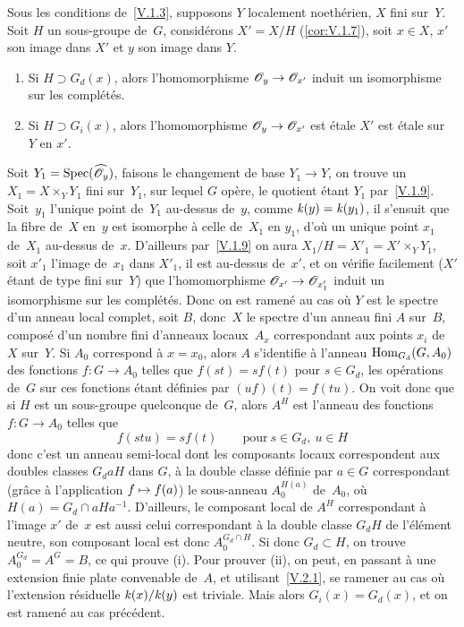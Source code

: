 \begin{proposition}
\label{V.2.2}
Sous les conditions de~\ref{V.1.3}, supposons $Y$ localement
noeth\'erien, $X$ fini sur~$Y$. Soit $H$ un sous-groupe de~$G$,
consid\'erons $X'=X/H$ (\cf \ref{cor:V.1.7}), soit
$x\in X$, $x'$ son image dans $X'$ et $y$ son image dans $Y$.
\begin{enumerate}
\item[(i)] Si $H\supset G_d(x)$, alors l'homomorphisme
$\cal{O}_y\to\cal{O}_{x'}$ induit un isomorphisme sur les
compl\'et\'es.
\item[(ii)] Si $H\supset G_i(x)$, alors l'homomorphisme $\cal{O}_y\to
\cal{O}_{x'}$ est \'etale \ie $X'$ est \'etale sur~$Y$ en $x'$.
\end{enumerate}
\end{proposition}
Soit $Y_1=\Spec(\widehat{\cal{O}_y})$, faisons le changement de base
$Y_1\to Y$, on trouve un $X_1=X\times_Y Y_1$ fini sur~$Y_1$, sur
lequel $G$ op\`ere, le quotient \'etant $Y_1$
par~\ref{V.1.9}. Soit~$y_1$ l'unique point de~$Y_1$ au-dessus de~$y$,
comme
$\mathit{k}(y)=\mathit{k}(y_1)$,
il s'ensuit que la fibre de~$X$ en~$y$
est isomorphe \`a celle de~$X_1$ en $y_1$, d'o\`u un unique point
$x_1$ de~$X_1$ au-dessus de~$x$. D'ailleurs par~\ref{V.1.9} on aura
$X_1/H=X'_1=X'\times_Y Y_1$, soit $x'_1$ l'image de~$x_1$ dans $X'_1$,
il est au-dessus de~$x'$, et on v\'erifie facilement ($X'$ \'etant
de type fini sur~$Y$) que l'homomorphisme
$\cal{O}_{x'}\to\cal{O}_{x'_1}$ induit un isomorphisme sur les
compl\'et\'es. Donc on est ramen\'e au cas o\`u $Y$ est le
spectre d'un anneau local complet, soit $B$, donc~$X$ le spectre d'un
anneau fini $A$ sur~$B$, compos\'e d'un nombre fini d'anneaux locaux~$A_x$ correspondant
aux points $x_i$ de~$X$ sur~$Y$. Si $A_0$ correspond \`a $x=x_0$,
alors $A$ s'identifie \`a l'anneau $\operatorname{Hom}_{G_d}(G,A_0)$ des fonctions
$f\colon G\to A_0$ telles que $f(st)=sf(t)$ pour $s\in G_d$, les
op\'erations de~$G$ sur ces fonctions \'etant d\'efinies par
$(uf)(t)=f(tu)$. On voit donc que si $H$ est un sous-groupe quelconque
de~$G$, alors $A^H$ est l'anneau des fonctions $f\colon G\to A_0$
telles que
$$
f(stu)=sf(t)\qquad\text{pour}\ s\in G_d,\ u\in H
$$
donc c'est un anneau semi-local dont les composants locaux
correspondent aux doubles classes $G_daH$ dans $G$, \`a la double
classe d\'efinie par $a\in G$ correspondant (gr\^ace \`a
l'application $f\mto f(a)$) le sous-anneau $A_0^{H(a)}$ de~$A_0$,
o\`u $H(a)=G_d\cap aHa^{-1}$. D'ailleurs, le composant local de
$A^H$ correspondant \`a l'image $x'$ de~$x$ est aussi celui
correspondant \`a la double classe $G_dH$ de l'\'el\'ement
neutre, son composant local est donc $A_0^{G_d\cap H}$. Si donc
$G_d\subset H$,
on trouve $A_0^{G_d}=A^G=B$, ce qui prouve (i). Pour
prouver (ii), on peut, en passant \`a une extension finie plate
convenable de~$A$, et utilisant~\ref{V.2.1}, se ramener au cas o\`u
l'extension r\'esiduelle
$\mathit{k}(x)/\mathit{k}(y)$
est triviale. Mais
alors $G_i(x)=G_d(x)$, et on est ramen\'e au cas pr\'ec\'edent.

